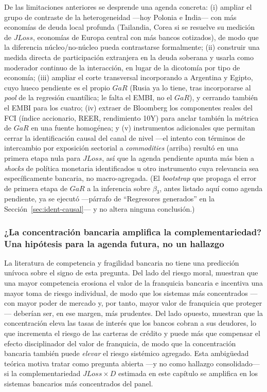 De las limitaciones anteriores se desprende una agenda concreta: (i) ampliar el grupo de contraste de la heterogeneidad —hoy Polonia e India— con más economías de deuda local profunda (Tailandia, Corea si se resuelve su medición de $JLoss$, economías de Europa central con más bancos cotizados), de modo que la diferencia núcleo/no-núcleo pueda contrastarse formalmente; (ii) construir una medida directa de participación extranjera en la deuda soberana y usarla como moderador continuo de la interacción, en lugar de la dicotomía por tipo de economía; (iii) ampliar el corte transversal incorporando a Argentina y Egipto, cuyo hueco pendiente es el propio $GaR$ (Rusia ya lo tiene, tras incorporarse al \textit{pool} de la regresión cuantílica; le falta el EMBI, no el $GaR$), y cerrando también el EMBI para los cuatro; (iv) extraer de Bloomberg los componentes reales del FCI (índice accionario, REER, rendimiento 10Y) para anclar también la métrica de $GaR$ en una fuente homogénea; y (v) instrumentos adicionales que permitan cerrar la identificación causal del canal de nivel —el intento con términos de intercambio por exposición sectorial a \textit{commodities} (arriba) resultó en una primera etapa nula para $JLoss$, así que la agenda pendiente apunta más bien a \textit{shocks} de política monetaria identificados u otro instrumento cuya relevancia sea específicamente bancaria, no macro-agregada. (El \textit{bootstrap} que propaga el error de primera etapa de $GaR$ a la inferencia sobre $\beta_3$, antes listado aquí como agenda pendiente, ya se ejecutó —párrafo de ``Regresores generados'' en la Sección~\ref{sec:ident-causal}— y no altera ninguna conclusión.)

\subsubsection{¿La concentración bancaria amplifica la complementariedad? Una hipótesis para la agenda futura, no un hallazgo}

La literatura de competencia y fragilidad bancaria no tiene una predicción unívoca sobre el signo de esta pregunta. Del lado del riesgo moral, \citet{MMR2010b} muestran que una mayor competencia erosiona el valor de la franquicia bancaria e incentiva una mayor toma de riesgo individual, de modo que los sistemas más concentrados —con mayor poder de mercado y, por tanto, mayor valor de franquicia que proteger— deberían ser, en ese margen, más prudentes. Del lado opuesto, \citet{BoydDeNicolo2005} muestran que la concentración eleva las tasas de interés que los bancos cobran a sus deudores, lo que incrementa el riesgo de las carteras de crédito y puede más que compensar el efecto disciplinador del valor de franquicia, de modo que la concentración bancaria también puede \emph{elevar} el riesgo sistémico agregado. Esta ambigüedad teórica motiva tratar como pregunta abierta —y no como hallazgo consolidado— si la complementariedad $JLoss\times D$ estimada en este capítulo se amplifica en los sistemas bancarios más concentrados del panel.

